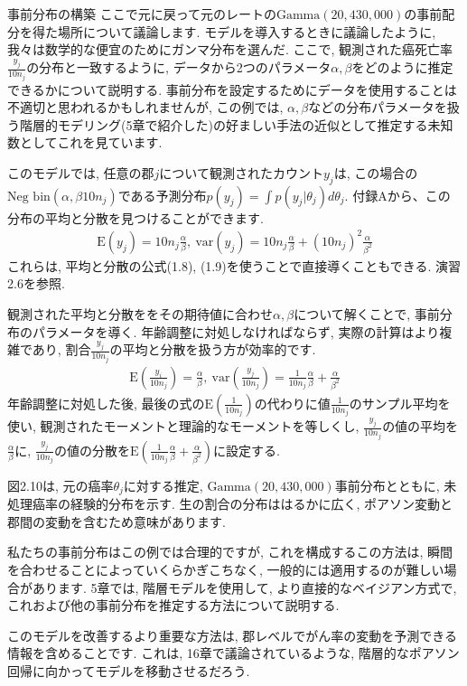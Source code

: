 \documentclass[10pt,dvipdfmx,a4]{beamer}
\newcommand{\eq}[1]{\begin{align}#1\end{align}}
\begin{document}

\begin{frame}{事前分布の構築}
ここで元に戻って元のレートの$\text{Gamma}(20,430,000)$の事前配分を得た場所について議論します.
モデルを導入するときに議論したように, 我々は数学的な便宜のためにガンマ分布を選んだ.
ここで, 観測された癌死亡率$\tfrac{y_j}{10n_j}$の分布と一致するように, データから2つのパラメータ$\alpha,\beta$をどのように推定できるかについて説明する.
事前分布を設定するためにデータを使用することは不適切と思われるかもしれませんが, この例では, $\alpha,\beta$などの分布パラメータを扱う階層的モデリング(5章で紹介した)の好ましい手法の近似として推定する未知数としてこれを見ています.

このモデルでは, 任意の郡$j$について観測されたカウント$y_j$は, この場合の$\text{Neg bin}(\alpha,\beta10n_j)$である予測分布$p(y_j)= \int p(y_j|\theta_j)d\theta_j$.
付録Aから、この分布の平均と分散を見つけることができます.
\eq{\text{E}(y_j)=10n_j\frac{\alpha}{\beta},\ \text{var}(y_j)=10n_j\frac{\alpha}{\beta}+(10n_j)^2\frac{\alpha}{\beta^2}}
これらは, 平均と分散の公式(1.8), (1.9)を使うことで直接導くこともできる.
演習2.6を参照.
\end{frame}


\begin{frame}
観測された平均と分散ををその期待値に合わせ$\alpha, \beta$について解くことで, 事前分布のパラメータを導く.
年齢調整に対処しなければならず, 実際の計算はより複雑であり, 割合$\tfrac{y_j}{10n_j}$の平均と分散を扱う方が効率的です.
\eq{\text{E}\left(\frac{y_i}{10n_j}\right)=\frac{\alpha}{\beta},\ \text{var}\left(\frac{y_j}{10n_j}\right)=\frac{1}{10n_j}\frac{\alpha}{\beta}+\frac{\alpha}{\beta^2}}
年齢調整に対処した後, 最後の式の$\text{E}\left(\frac{1}{10n_j}\right)$の代わりに値$\frac{1}{10n_j}$のサンプル平均を使い, 観測されたモーメントと理論的なモーメントを等しくし, $\frac{y_j}{10n_j}$の値の平均を$\frac{\alpha}{\beta}$に, $\frac{y_j}{10n_j}$の値の分散を$\text{E}\left(\frac{1}{10n_j}\frac{\alpha}{\beta}+\frac{\alpha}{\beta^2}\right)$に設定する.
\end{frame}


\begin{frame}
図2.10は, 元の癌率$\theta_j$に対する推定, $\text{Gamma}(20,430,000)$事前分布とともに, 未処理癌率の経験的分布を示す.
生の割合の分布ははるかに広く, ポアソン変動と郡間の変動を含むため意味があります.

私たちの事前分布はこの例では合理的ですが, これを構成するこの方法は, 瞬間を合わせることによっていくらかぎこちなく, 一般的には適用するのが難しい場合があります.
5章では, 階層モデルを使用して, より直接的なベイジアン方式で, これおよび他の事前分布を推定する方法について説明する.

このモデルを改善するより重要な方法は, 郡レベルでがん率の変動を予測できる情報を含めることです.
これは, 16章で議論されているような, 階層的なポアソン回帰に向かってモデルを移動させるだろう.
\end{frame}
\end{document}
